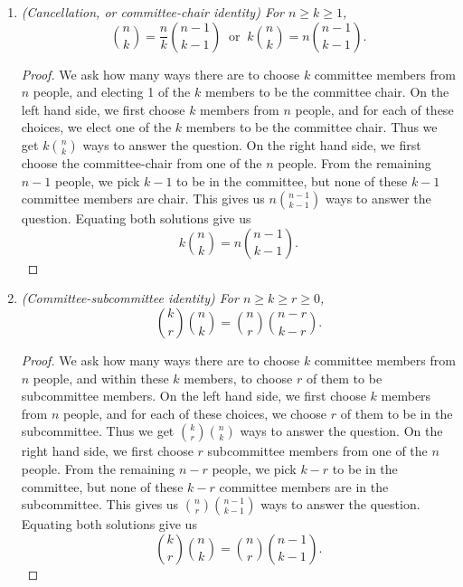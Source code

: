 \documentclass{article}
\begin{document}
\begin{enumerate}[label={\bf Q\arabic*:}]
    \begin{proof}
      \begin{align*}
        \binom{n+m+1}{n} &=\binom{n+m+1}{m+1} &(\text{symmetry identity}) \\
        &=\binom{m}{m}+\binom{m+1}{m}+\ldots+\binom{m+n}{m} &(\text{
          upper summation identity}) \\
        &=\binom{m}{0}+\binom{m+1}{1}+\ldots+\binom{m+n}{n} &(\text{
          symmetry identity}) \\
        &=\sum_{k=0}^n\binom{m+k}{k}.
      \end{align*}
    \end{proof}

  \item \it (Cancellation, or committee-chair identity) For $n\geq k\geq1$,
    \[\binom{n}{k} =\frac{n}{k}\binom{n-1}{k-1}\;\; \text{or}\;\;
    k\binom{n}{k}=n\binom{n-1}{k-1}.\]

    \begin{proof}
      We ask how many ways there are to choose $k$
      committee members from $n$ people, and electing 1 of the $k$ members
      to be the committee chair. On the left hand side, we first choose $k$
      members from $n$ people, and for each of these choices, we elect
      one of the $k$ members to be the committee chair. Thus we get
      $k\binom{n}{k}$ ways to answer the question. On the right hand side,
      we first choose the committee-chair from one of the $n$ people. From
      the remaining $n-1$ people, we pick $k-1$ to be in the committee, but
      none of these $k-1$ committee members are chair. This gives us
      $n\binom{n-1}{k-1}$ ways to answer the question. Equating both
      solutions give us
      \[k\binom{n}{k}=n\binom{n-1}{k-1}.\]
    \end{proof}

  \item \it (Committee-subcommittee identity) For $n\geq k\geq r\geq0$,
    \[\binom{k}{r}\binom{n}{k} = \binom{n}{r}\binom{n-r}{k-r}.\]

    \begin{proof}
      We ask how many ways there are to choose $k$
      committee members from $n$ people, and within these $k$ members, to
      choose $r$ of them to be subcommittee members. On the left hand
      side, we first choose $k$ members from $n$ people, and for each of
      these choices, we choose $r$ of them to be in the subcommittee.
      Thus we get $\binom{k}{r}\binom{n}{k}$ ways to answer the
      question. On the right hand side, we first choose $r$ subcommittee
      members from one of the $n$ people. From the remaining $n-r$ people,
      we pick $k-r$ to be in the committee, but none of these $k-r$
      committee members are in the subcommittee. This gives us
      $\binom{n}{r}\binom{n-1}{k-1}$ ways to answer the question. Equating
      both solutions give us
      \[\binom{k}{r}\binom{n}{k}=\binom{n}{r}\binom{n-1}{k-1}.\]
    \end{proof}


\end{enumerate}
\end{document}
